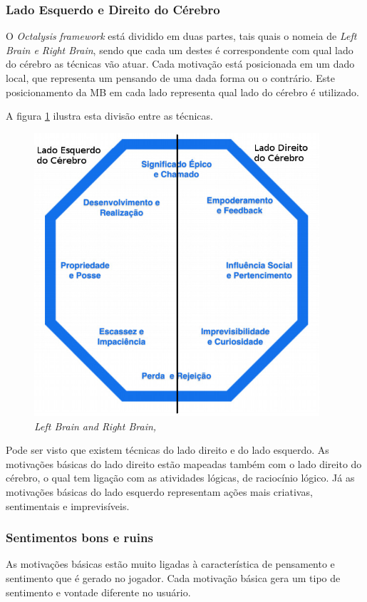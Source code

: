 \subsubsection{Lado Esquerdo e Direito do Cérebro}
\label{sub:leftright}
O \textit{Octalysis} \textit{framework} está dividido em duas partes, tais quais o \cite{chou2015actionable} nomeia
de \textit{Left Brain e Right Brain}, sendo que cada um destes é correspondente com qual lado do cérebro
as técnicas vão atuar. Cada motivação está posicionada em um dado local, que
representa um pensando de uma dada forma ou o contrário. Este posicionamento
da MB em cada lado representa qual lado do cérebro é utilizado.

A figura \ref{fig:octalysisleftright} ilustra esta divisão entre as técnicas.

\begin{figure}[h]
    \centering
    \includegraphics[width=400px, scale=1]{figuras/octalysisleftright}
    \caption{\textit{Left Brain and Right Brain, \cite{chou2015actionable}}}
    \label{fig:octalysisleftright}
\end{figure}

Pode ser visto que existem técnicas do lado direito e do lado esquerdo. As
motivações básicas do lado direito estão mapeadas também com o lado direito
do cérebro, o qual tem ligação com as atividades lógicas, de raciocínio lógico.
Já as motivações básicas do lado esquerdo representam ações mais criativas,
sentimentais e imprevisíveis.

\subsubsection{Sentimentos bons e ruins}
\label{sub:whiteblack}
As motivações básicas estão muito ligadas à característica de pensamento e
sentimento que é gerado no jogador. Cada motivação básica gera um tipo de
sentimento e vontade diferente no usuário.

